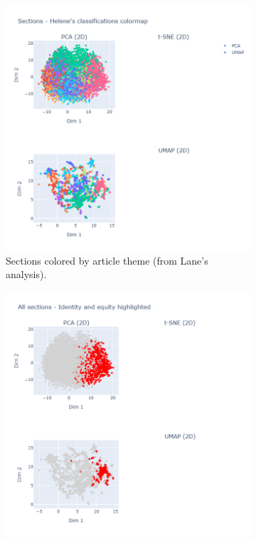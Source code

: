 \begin{figure}
    \centering
    \begin{subfigure}[b]{0.49\textwidth}
        \centering
        \includegraphics[width=\textwidth]{media/helene_themes.png}
        \caption{Sections colored by article theme (from Lane's analysis).}
        \label{fig:helene_themes}
    \end{subfigure}
    \hfill
    \begin{subfigure}[b]{0.49\textwidth}
        \centering
        \includegraphics[width=\textwidth]{media/helene_identity_equity.png}

\end{subfigure}
\end{figure}

